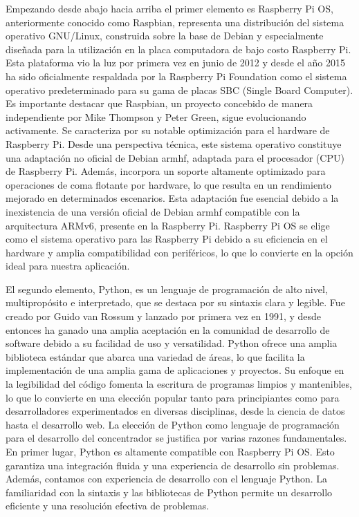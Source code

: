 Empezando desde abajo hacia arriba el primer elemento es Raspberry Pi OS, anteriormente conocido como Raspbian, representa una distribución del sistema operativo GNU/Linux, construida sobre la base de Debian y especialmente diseñada para la utilización en la placa computadora de bajo costo Raspberry Pi. Esta plataforma vio la luz por primera vez en junio de 2012 y desde el año 2015 ha sido oficialmente respaldada por la Raspberry Pi Foundation como el sistema operativo predeterminado para su gama de placas SBC (Single Board Computer).
Es importante destacar que Raspbian, un proyecto concebido de manera independiente por Mike Thompson y Peter Green, sigue evolucionando activamente. Se caracteriza por su notable optimización para el hardware de Raspberry Pi. Desde una perspectiva técnica, este sistema operativo constituye una adaptación no oficial de Debian armhf, adaptada para el procesador (CPU) de Raspberry Pi. Además, incorpora un soporte altamente optimizado para operaciones de coma flotante por hardware, lo que resulta en un rendimiento mejorado en determinados escenarios. Esta adaptación fue esencial debido a la inexistencia de una versión oficial de Debian armhf compatible con la arquitectura ARMv6, presente en la Raspberry Pi.
Raspberry Pi OS se elige como el sistema operativo para las Raspberry Pi debido a su eficiencia en el hardware y amplia compatibilidad con periféricos, lo que lo convierte en la opción ideal para nuestra aplicación.

El segundo elemento, Python, es un lenguaje de programación de alto nivel, multipropósito e interpretado, que se destaca por su sintaxis clara y legible. Fue creado por Guido van Rossum y lanzado por primera vez en 1991, y desde entonces ha ganado una amplia aceptación en la comunidad de desarrollo de software debido a su facilidad de uso y versatilidad. Python ofrece una amplia biblioteca estándar que abarca una variedad de áreas, lo que facilita la implementación de una amplia gama de aplicaciones y proyectos. Su enfoque en la legibilidad del código fomenta la escritura de programas limpios y mantenibles, lo que lo convierte en una elección popular tanto para principiantes como para desarrolladores experimentados en diversas disciplinas, desde la ciencia de datos hasta el desarrollo web.
La elección de Python como lenguaje de programación para el desarrollo del concentrador se justifica por varias razones fundamentales. En primer lugar, Python es altamente compatible con Raspberry Pi OS. Esto garantiza una integración fluida y una experiencia de desarrollo sin problemas.
Además, contamos con experiencia de desarrollo con el lenguaje Python. La familiaridad con la sintaxis y las bibliotecas de Python permite un desarrollo eficiente y una resolución efectiva de problemas.


